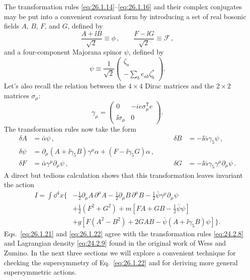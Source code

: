 The transformation rules \eqref{eq:26.1.14}--\eqref{eq:26.1.16} and their
complex conjugates may be put into a convenient covariant form by introducing
a set of real bosonic fields \(A\), \(B\), \(F\), and \(G\), defined by
\begin{equation}
  \frac{A+\ii B}{\sqrt{2}}\equiv\phi\,,
  \qquad
  \frac{F-\ii G}{\sqrt{2}}\equiv\mathcal{F}\,,
  \tag{26.1.19}\label{eq:26.1.19}
\end{equation}
and a four-component Majorana spinor \(\psi\), defined by
\begin{equation}
  \psi\equiv\frac{1}{\sqrt{2}}
  \begin{pmatrix}
    \zeta_a\\
    \displaystyle-\sum_b e_{ab}\zeta_b^*
  \end{pmatrix}.
  \tag{26.1.20}\label{eq:26.1.20}
\end{equation}
Let's also recall the relation between the \(4\times4\) Dirac matrices and the
\(2\times2\) matrices \(\sigma_\mu\):
\[
  \gamma_\mu=
  \begin{pmatrix}
    0&-ie\sigma_\mu^{\mathsf T} e\\
    \ii\sigma_\mu&0
  \end{pmatrix}.
\]
The transformation rules now take the form
\begin{equation}
  \begin{aligned}
    \delta A&=\bar{\alpha}\psi\,,
    &\qquad
    \delta B&=-\ii\bar{\alpha}\gamma_5\psi\,,
    \\
    \delta\psi
    &=\partial_\mu(A+\ii\gamma_5B)\gamma^\mu\alpha
      +(F-\ii\gamma_5G)\alpha\,,
    \\
    \delta F&=\bar{\alpha}\gamma^\mu\partial_\mu\psi\,,
    &\qquad
    \delta G&=-\ii\bar{\alpha}\gamma_5\gamma^\mu\partial_\mu\psi\,.
  \end{aligned}
  \tag{26.1.21}\label{eq:26.1.21}
\end{equation}
A direct but tedious calculation shows that this transformation leaves
invariant the action
\begin{equation}
  \begin{aligned}
  I=\int \dd^4x\biggl\{
    &-\frac12\partial_\mu A\,\partial^\mu A
     -\frac12\partial_\mu B\,\partial^\mu B
     -\frac12\bar{\psi}\gamma^\mu\partial_\mu\psi
  \\
    &+\frac12(F^2+G^2)
     +m\left[FA+GB-\frac12\bar{\psi}\psi\right]
  \\
    &+g\left[F(A^2-B^2)+2GAB
      -\bar{\psi}(A+\ii\gamma_5B)\psi\right]\biggr\}.
  \end{aligned}
  \tag{26.1.22}\label{eq:26.1.22}
\end{equation}
Eqs.~\eqref{eq:26.1.21} and \eqref{eq:26.1.22} agree with the transformation
rules \eqref{eq:24.2.8} and Lagrangian density \eqref{eq:24.2.9} found in the
original work of Wess and Zumino. In the next three sections we will explore a
convenient technique for checking the supersymmetry of
Eq.~\eqref{eq:26.1.22} and for deriving more general supersymmetric actions.

